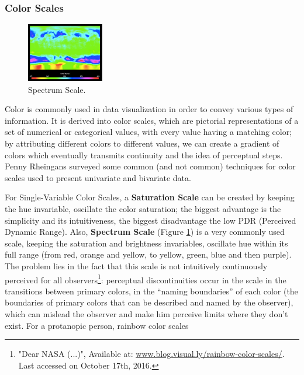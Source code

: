 \subsubsection{Color Scales}
%
\begin{figure}
	\centering
    \vspace{-10pt}
    \includegraphics[width=0.3\textwidth]{images/background/SpectrumScale.png}
    \caption[Spectrum Scale Example]{Spectrum Scale. \protect\cite{Rheingans2000}}
    \label{fig:spectrum}
\end{figure}
%
Color is commonly used in data visualization in order to convey various types of information. It is derived into color scales,
which are pictorial representations of a set of numerical or categorical values, with every value having
a matching color; by attributing different colors to different values, we can create a gradient of colors
which eventually transmits continuity and the idea of perceptual steps. Penny Rheingans \cite{Rheingans2000} surveyed some
common (and not common) techniques for color scales used to present univariate and bivariate data. \par
%
For Single-Variable Color Scales, a \textbf{Saturation Scale} can be created by keeping the hue
invariable, oscillate the color saturation; the biggest advantage is the simplicity and its intuitiveness,
the biggest disadvantage the low PDR (Perceived Dynamic Range). Also, \textbf{Spectrum Scale} (Figure \ref{fig:spectrum})
is a very commonly used scale, keeping the saturation and brightness invariables, oscillate hue within its full
range (from red, orange and yellow, to yellow, green, blue and then purple). The problem lies in the fact that this scale
is not intuitively continuously perceived for all observers\footnote{"Dear NASA (...)",
Available at: \url{www.blog.visual.ly/rainbow-color-scales/}. Last accessed on October 17th, 2016.}:
perceptual discontinuities occur in the scale in the transitions between primary colors, in the “naming boundaries”
of each color (the boundaries of primary colors that can be described and named by the observer), which can mislead the
observer and make him perceive limits where they don’t exist. For a protanopic person, rainbow color scales

